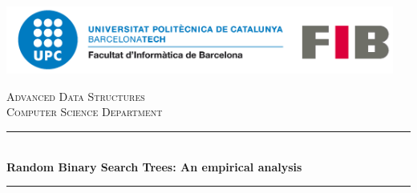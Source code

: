 \begin{titlepage}

\newcommand{\HRule}{\rule{\linewidth}{0.5mm}} %

\begin{center}
\includegraphics[width=12.75cm]{title/logo-upc.png}\\[1cm] %
\end{center}
 

\center %





\textsc{\LARGE Advanced Data Structures}\\[1.0cm] %
\textsc{\large Computer Science Department}\\[0.5cm] %

\makeatletter
\HRule \\[0.4cm]
{ \huge \bfseries Random Binary Search Trees: An empirical analysis}\\[0.4cm] %
\HRule \\[1.5cm]
 \vspace{0.25cm}


\end{titlepage}
